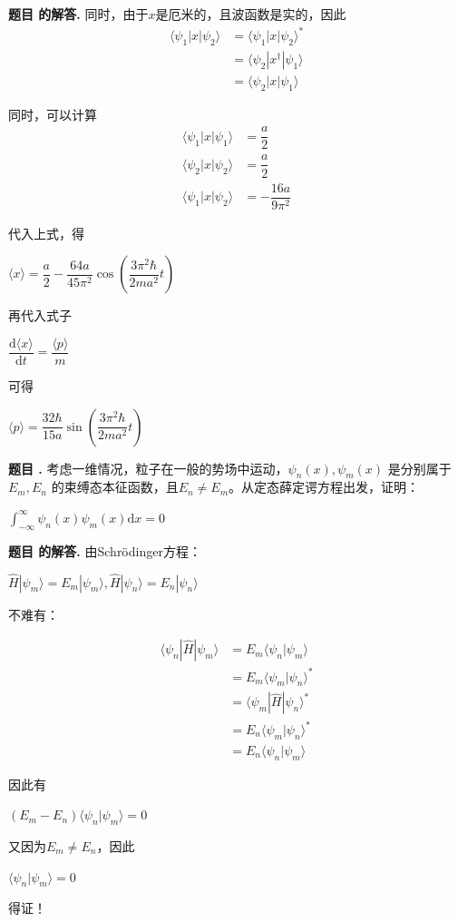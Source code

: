 \documentclass[12pt, a4paper, oneside]{ctexart}
\newcounter{problemname}
\newenvironment{problem}
  {\begin{shaded}\stepcounter{problemname}\par\noindent\textbf{题目 \theproblemname. }}
  {\end{shaded}\par}
\newenvironment{solution}
  {\par\noindent\textbf{题目 \theproblemname 的解答. }}
  {\par}
\begin{document}
\begin{solution}
  同时，由于$x$是厄米的，且波函数是实的，因此
  \begin{align*}
    \langle \psi_1 | x|\psi_2 \rangle &= \langle \psi_1 | x|\psi_2 \rangle^* \\
    &= \langle \psi_2 | x^\dagger|\psi_1 \rangle\\
    &= \langle \psi_2 | x|\psi_1 \rangle
  \end{align*}
  
  同时，可以计算
  \begin{align*}
    \langle \psi_1 | x|\psi_1 \rangle &= \dfrac{a}{2} \\
    \langle \psi_2 | x|\psi_2 \rangle &= \dfrac{a}{2} \\
    \langle \psi_1 | x|\psi_2 \rangle &= -\dfrac{16a}{9\pi^2}
  \end{align*}
  
  代入上式，得

  \centerline{$\langle x \rangle = \dfrac{a}{2} - \dfrac{64a}{45\pi^2}\cos\left(\dfrac{3\pi^2\hbar}{2ma^2}t\right)$}

  再代入式子

  \centerline{$\dfrac{\mathrm{d} \langle x \rangle}{\mathrm{d}t} = \dfrac{\langle p \rangle}{m}$}

  可得

  \centerline{$\langle p \rangle = \dfrac{32\hbar}{15a}\sin\left(\dfrac{3\pi^2\hbar}{2ma^2}t\right)$}
\end{solution}

\begin{problem}
  考虑一维情况，粒子在一般的势场中运动，$\psi_n(x),\psi_m(x)$ 是分别属于$E_m,E_n$ 的束缚态本征函数，且$E_n \neq E_m$。从定态薛定谔方程出发，证明：

  \centerline{$\displaystyle\int_{-\infty}^{\infty} \psi_n(x) \psi_m(x)\mathrm{d}x = 0$}
\end{problem}

\begin{solution}
  由Schrödinger方程：

  \centerline{$\hat{H}|\psi_m\rangle = E_m |\psi_m\rangle,\hat{H}|\psi_n\rangle = E_n |\psi_n\rangle$}

  不难有：

  \begin{align*}
    \langle \psi_n | \hat{H} | \psi_m \rangle &= E_m \langle \psi_n | \psi_m \rangle \\
    &= E_m \langle \psi_m | \psi_n \rangle^* \\
    &= \langle \psi_m | \hat{H} | \psi_n \rangle^* \\
    &= E_n \langle \psi_m | \psi_n \rangle^*\\
    &= E_n \langle \psi_n | \psi_m \rangle
  \end{align*}

  因此有

  \centerline{$(E_m - E_n) \langle \psi_n | \psi_m \rangle = 0$}

  又因为$E_m \neq E_n$，因此

  \centerline{$\langle \psi_n | \psi_m \rangle = 0$}

  得证！
\end{solution}
\end{document}
